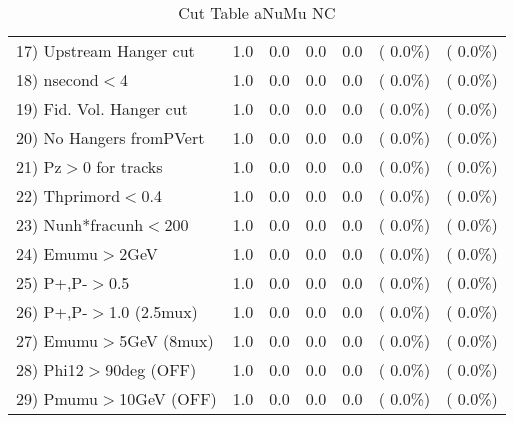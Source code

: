 \begin{table}[h!]
\begin{tabular}{||l||r|r|r|r|r|r||}
 17) Upstream Hanger cut  &          1.0 &          0.0 &          0.0 &          0.0 & (  0.0\%) & (  0.0\%) \\
 18) nsecond$<$4          &          1.0 &          0.0 &          0.0 &          0.0 & (  0.0\%) & (  0.0\%) \\
 19) Fid. Vol. Hanger cut &          1.0 &          0.0 &          0.0 &          0.0 & (  0.0\%) & (  0.0\%) \\
 20) No Hangers fromPVert &          1.0 &          0.0 &          0.0 &          0.0 & (  0.0\%) & (  0.0\%) \\
 21) Pz$>$0 for tracks    &          1.0 &          0.0 &          0.0 &          0.0 & (  0.0\%) & (  0.0\%) \\
 22) Thprimord$<$0.4      &          1.0 &          0.0 &          0.0 &          0.0 & (  0.0\%) & (  0.0\%) \\
 23) Nunh*fracunh$<$200   &          1.0 &          0.0 &          0.0 &          0.0 & (  0.0\%) & (  0.0\%) \\
 24) Emumu$>$2GeV         &          1.0 &          0.0 &          0.0 &          0.0 & (  0.0\%) & (  0.0\%) \\
 25) P+,P-$>$0.5          &          1.0 &          0.0 &          0.0 &          0.0 & (  0.0\%) & (  0.0\%) \\
 26) P+,P-$>$1.0 (2.5mux) &          1.0 &          0.0 &          0.0 &          0.0 & (  0.0\%) & (  0.0\%) \\
 27) Emumu$>$5GeV  (8mux) &          1.0 &          0.0 &          0.0 &          0.0 & (  0.0\%) & (  0.0\%) \\
 28) Phi12$>$90deg  (OFF) &          1.0 &          0.0 &          0.0 &          0.0 & (  0.0\%) & (  0.0\%) \\
 29) Pmumu$>$10GeV  (OFF) &          1.0 &          0.0 &          0.0 &          0.0 & (  0.0\%) & (  0.0\%) \\
 \hline
 \hline
 \end{tabular}
 \caption{Cut Table  aNuMu NC }
 \label{tab-cutcohjpsi-mumu_anumunc}
 \end{table}
